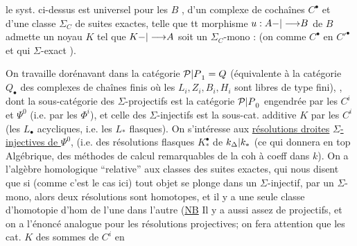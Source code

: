  le syst. ci-dessus est universel
pour les $B$ ,  d'un complexe
de cochaînes 
$C^\bullet$ et d'une classe
$\Sigma_C$ de suites exactes, telle que tt
morphisme $u:A{-|\longrightarrow}B$ de $B$ admette
un noyau $K$ tel que $K{-|\longrightarrow}A$ soit un
$\Sigma_C$-mono : (on  comme
 $C^\bullet$ en $C'^\bullet$ et qui
 $\Sigma$-exact ).

On travaille dorénavant dans la catégorie ${\mathcal P|P}_1=Q$ (équivalente à la catégorie $Q_\bullet$ des complexes de chaînes finis où les $L_i,Z_i,B_i,H_i$ sont libres de type fini), , dont la sous-catégorie des $\Sigma$-projectifs est  la catégorie  ${\mathcal P|P}_0$ engendrée par les $C^i$ et $\Psi^0$ (i.e. par les $\Phi^i$), et celle des $\Sigma$-injectifs est la sous-cat. additive $K$   par les $C^i$ (les $L_\bullet$  acycliques, i.e. les $L_*$ flasques\unsure{\ldots}). On s'intéresse aux \uline{résolutions droites}  \uline{$\Sigma$-injectives de $\Psi^0$}, (i.e. des résolutions flasques $K_*^\bullet$ de ${k_\Delta|k_*}$ \inserted{$\unsure{\Psi}$} \unsure{---} (ce qui donnera  en top Algébrique, des méthodes de calcul remarquables de la coh à coeff dans $k$). On a l'algèbre homologique ``relative'' aux classes des suites exactes, qui nous disent que si (comme c'est le cas ici) tout objet  se plonge dans un $\Sigma$-injectif,  par un $\Sigma$-mono, alors  deux résolutions sont homotopes, et il y a une seule classe d'homotopie d'hom de l'une dans l'autre (\uline{NB} Il y a aussi assez de projectifs, et on a l'énoncé analogue pour les résolutions projectives; on fera attention que les cat. $K$ des sommes de $C^i$ en

